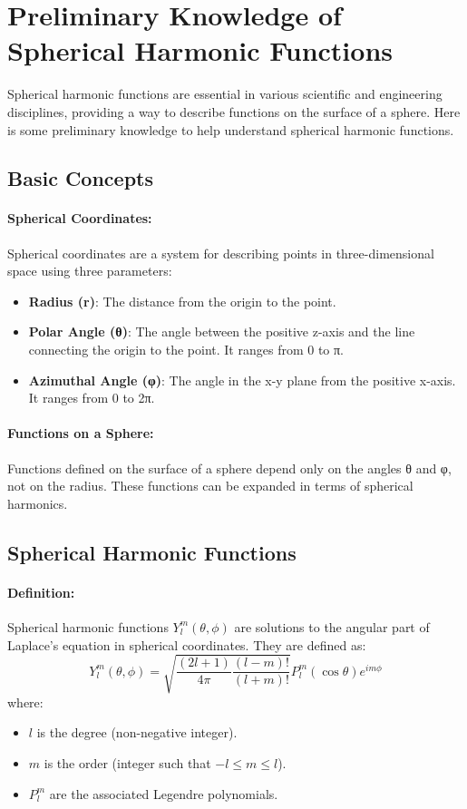 \section{Preliminary Knowledge of Spherical Harmonic Functions}

Spherical harmonic functions are essential in various scientific and engineering disciplines, providing a way to describe functions on the surface of a sphere. Here is some preliminary knowledge to help understand spherical harmonic functions.

\subsection*{Basic Concepts}

\paragraph{Spherical Coordinates:}
Spherical coordinates are a system for describing points in three-dimensional space using three parameters:
\begin{itemize}
	\item \textbf{Radius (r)}: The distance from the origin to the point.
	\item \textbf{Polar Angle (θ)}: The angle between the positive z-axis and the line connecting the origin to the point. It ranges from 0 to π.
	\item \textbf{Azimuthal Angle (φ)}: The angle in the x-y plane from the positive x-axis. It ranges from 0 to 2π.
\end{itemize}

\paragraph{Functions on a Sphere:}
Functions defined on the surface of a sphere depend only on the angles θ and φ, not on the radius. These functions can be expanded in terms of spherical harmonics.

\subsection*{Spherical Harmonic Functions}

\paragraph{Definition:}
Spherical harmonic functions \( Y_l^m(\theta, \phi) \) are solutions to the angular part of Laplace's equation in spherical coordinates. They are defined as:
\[
Y_l^m(\theta, \phi) = \sqrt{\frac{(2l+1)}{4\pi} \frac{(l-m)!}{(l+m)!}} P_l^m(\cos \theta) e^{im\phi}
\]
where:
\begin{itemize}
	\item \( l \) is the degree (non-negative integer).
	\item \( m \) is the order (integer such that \( -l \leq m \leq l \)).
	\item \( P_l^m \) are the associated Legendre polynomials.
\end{itemize}

